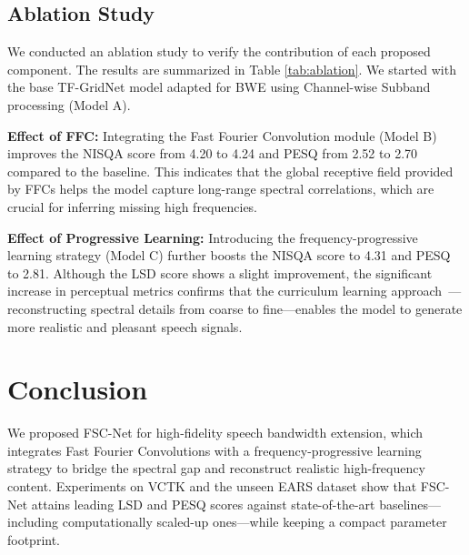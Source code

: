 \documentclass[journal]{IEEEtran}
\begin{document}
\subsection{Ablation Study}
We conducted an ablation study to verify the contribution of each proposed component. The results are summarized in Table \ref{tab:ablation}.
We started with the base TF-GridNet model adapted for BWE using Channel-wise Subband processing (Model A). 

\begin{table}[htbp]
\caption{Ablation Study on Proposed Components}
\label{tab:ablation}
\centering
{}
\vspace{-0.1cm}
\end{table}


\textbf{Effect of FFC:} Integrating the Fast Fourier Convolution module (Model B) improves the NISQA score from 4.20 to 4.24 and PESQ from 2.52 to 2.70 compared to the baseline. This indicates that the global receptive field provided by FFCs helps the model capture long-range spectral correlations, which are crucial for inferring missing high frequencies.

\textbf{Effect of Progressive Learning:} Introducing the frequency-progressive learning strategy (Model C) further boosts the NISQA score to 4.31 and PESQ to 2.81. Although the LSD score shows a slight improvement, the significant increase in perceptual metrics confirms that the curriculum learning approach~\cite{bengio2009curriculum}—reconstructing spectral details from coarse to fine—enables the model to generate more realistic and pleasant speech signals.

\section{Conclusion}
We proposed FSC-Net for high-fidelity speech bandwidth extension, which integrates Fast Fourier Convolutions with a frequency-progressive learning strategy to bridge the spectral gap and reconstruct realistic high-frequency content. Experiments on VCTK and the unseen EARS dataset show that FSC-Net attains leading LSD and PESQ scores against state-of-the-art baselines—including computationally scaled-up ones—while keeping a compact parameter footprint.




\end{document}
